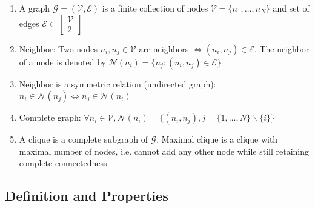 \documentclass[12pt,twoside]{article}
\begin{document}
\begin{enumerate}

	\item A graph $\mathcal{G} = (\mathcal{V}, \mathcal{E})$ is a finite collection of nodes $\mathcal{V} = \lbrace n_1,\ldots, n_N\rbrace$ and set of edges $\mathcal{E} \subset \begin{bmatrix}
	\mathcal{V} \\ 2
	\end{bmatrix}$

	\item Neighbor: Two nodes $n_i, n_j \in \mathcal{V}$ are neighbors $\Leftrightarrow (n_i,n_j)\in \mathcal{E}$. The neighbor of a node is denoted by $\mathcal{N}(n_i) = \lbrace n_j: (n_i,n_j)\in \mathcal{E}\rbrace$

	\item Neighbor is a symmetric relation (undirected graph): $n_i \in \mathcal{N}(n_j) \Leftrightarrow n_j \in \mathcal{N}(n_i) $

	\item Complete graph: $\forall n_i \in \mathcal{V}, \mathcal{N}(n_i) =\lbrace (n_i,n_j), j= \lbrace 1,\ldots, N\rbrace \backslash \lbrace i \rbrace\rbrace$

	\item A clique is a complete subgraph of $\mathcal{G}$. Maximal clique is a clique with maximal number of nodes, i.e. cannot add any other node while still retaining complete connectedness.
\end{enumerate}



\subsection{Definition and Properties}
\end{document}
